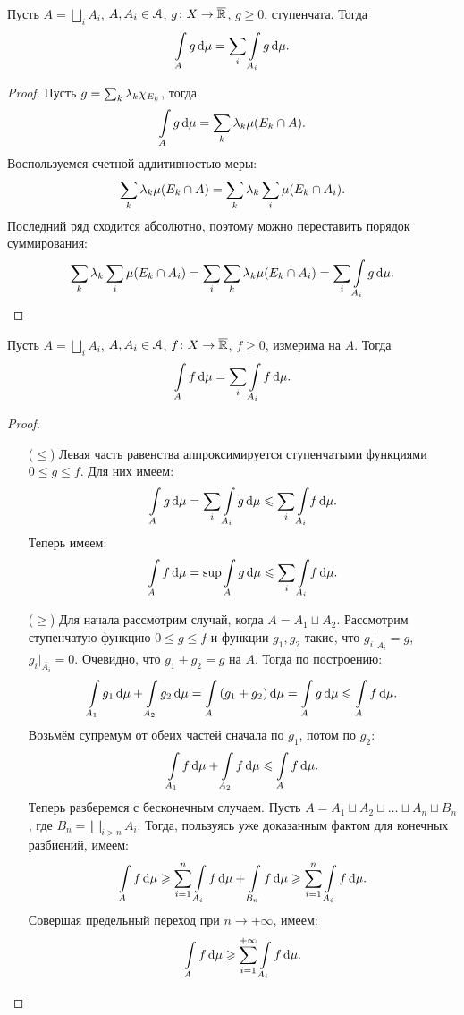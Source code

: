 \begin{lemma}
    Пусть $A = \bigsqcup_i{A_i}$, $A, A_i \in \mathcal{A}$, $g \colon X \to \overline{\mathbb{R}}$, $g \geqslant 0$, 
    ступенчата. Тогда
\[
    \int\limits_A{g \,\mathrm{d}\mu} = \sum_i{\int\limits_{A_i}{g \,\mathrm{d}\mu}}
.\] 
\end{lemma}
\begin{proof}
    Пусть $g = \sum_k{\lambda_k \chi_{E_k}}$, тогда
\[
    \int\limits_A{g \,\mathrm{d}\mu} = \sum_k{\lambda_k \mu(E_k \cap A)}
.\]
    Воспользуемся счетной аддитивностью меры:
\[
    \sum_k{\lambda_k \mu(E_k \cap A)} = \sum_k{\lambda_k \sum_i{\mu(E_k \cap A_i)}}
.\]
    Последний ряд сходится абсолютно, поэтому можно переставить порядок суммирования:
\[
    \sum_k{\lambda_k \sum_i{\mu(E_k \cap A_i)}} = \sum_i{\sum_k{\lambda_k \mu(E_k \cap A_i)}}
    = \sum_i{\int\limits_{A_i}{g \,\mathrm{d}\mu}}
.\]
\end{proof}

\begin{theorem}
    Пусть $A = \bigsqcup_i{A_i}$, $A, A_i \in \mathcal{A}$, $f \colon X \to \overline{\mathbb{R}}$, $f \geqslant 0$,
    измерима на $A$. Тогда
\[
    \int\limits_A{f \,\mathrm{d}\mu} = \sum_i{\int\limits_{A_i}{f \,\mathrm{d}\mu}}
.\] 
\end{theorem}
\begin{proof}
    \enewline
    \begin{itemize}
        \item[($\leqslant$)] Левая часть равенства аппроксимируется ступенчатыми функциями \\
            $0 \leqslant g \leqslant f$. Для них имеем:
\[
    \int\limits_A{g \,\mathrm{d}\mu} = \sum_i{\int\limits_{A_i}{g \,\mathrm{d}\mu}} \leqslant \sum_i{\int\limits_{A_i}}{f \,\mathrm{d}\mu}
.\]
            Теперь имеем:
\[
    \int\limits_{A}{f \,\mathrm{d}\mu} = \sup{\int\limits_{A}{g \,\mathrm{d}\mu}} \leqslant \sum_i{\int\limits_{A_i}}{f \,\mathrm{d}\mu}
.\]
        \item[($\geqslant$)] Для начала рассмотрим случай, когда $A = A_1 \sqcup A_2$. Рассмотрим
            ступенчатую функцию $0 \leqslant g \leqslant f$ и функции $g_1, g_2$ такие, 
            что $g_i\big|_{A_i} = g$, $g_i\big|_{\overline{A_i}} = 0$.
            Очевидно, что $g_1 + g_2 = g$ на $A$. Тогда по построению:
\[
    \int\limits_{A_1}{g_1 \,\mathrm{d}\mu} + \int\limits_{A_2}{g_2 \,\mathrm{d}\mu} = \int\limits_{A}{(g_1 + g_2)\,\mathrm{d}\mu}
    = \int\limits_{A}{g \,\mathrm{d}\mu} \leqslant \int\limits_{A}{f \,\mathrm{d}\mu}
.\]
            Возьмём супремум от обеих частей сначала по $g_1$, потом по $g_2$:
\[
    \int\limits_{A_1}{f \,\mathrm{d}\mu} + \int\limits_{A_2}{f \,\mathrm{d}\mu} \leqslant \int\limits_{A}{f \,\mathrm{d}\mu}
.\]
            Теперь разберемся с бесконечным случаем. Пусть $A = A_1 \sqcup A_2 \sqcup \ldots \sqcup A_n \sqcup B_n$,
            где $B_n = \bigsqcup_{i > n}{A_i}$. Тогда, пользуясь уже доказанным фактом для конечных разбиений,
            имеем:
\[
    \int\limits_{A}{f \,\mathrm{d}\mu} \geqslant \sum_{i = 1}^{n}{\int\limits_{A_i}{f \,\mathrm{d}\mu}} + \int\limits_{B_n}{f \,\mathrm{d}\mu} \geqslant 
    \sum_{i = 1}^{n}{\int\limits_{A_i}{f \,\mathrm{d}\mu}}
.\]
            Совершая предельный переход при $n \to +\infty$, имеем:
\[
    \int\limits_{A}{f \,\mathrm{d}\mu} \geqslant \sum_{i = 1}^{+\infty}{\int\limits_{A_i}{f \,\mathrm{d}\mu}}
.\]
    \end{itemize}
\end{proof}

